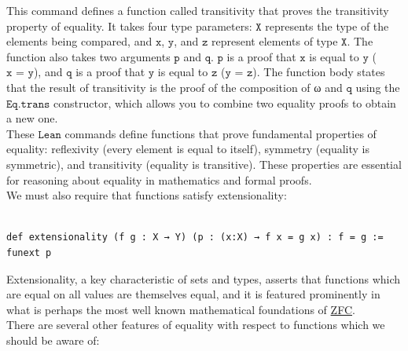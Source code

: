\documentclass{book}
\theoremstyle{definition}
\newcounter{lcounter}
\begin{document}
This command defines a function called transitivity that proves the transitivity property of equality. It takes four type parameters: $\texttt{X}$ represents the type of the elements being compared, and $\texttt{x}$, $\texttt{y}$, and $\texttt{z}$ represent elements of type $\texttt{X}$. The function also takes two arguments $\texttt{p}$ and $\texttt{q}$. $\texttt{p}$ is a proof that $\texttt{x}$ is equal to $\texttt{y}$ ($\texttt{x = y}$), and $\texttt{q}$ is a proof that $\texttt{y}$ is equal to $\texttt{z}$ ($\texttt{y = z}$). The function body states that the result of transitivity is the proof of the composition of ω and $\texttt{q}$ using the $\texttt{Eq.trans}$ constructor, which allows you to combine two equality proofs to obtain a new one.\\

These $\texttt{Lean}$ commands define functions that prove fundamental properties of equality: reflexivity (every element is equal to itself), symmetry (equality is symmetric), and transitivity (equality is transitive). These properties are essential for reasoning about equality in mathematics and formal proofs.\\

We must also require that functions satisfy extensionality:

\begin{center}
\begin{tcolorbox}[width=5in,colback={white},title={\begin{center}\texttt{Lean \thelcounter} \addtocounter{lcounter}{1}  \end{center}},colbacktitle=Blue,coltitle=black]
\begin{verbatim}

def extensionality (f g : X → Y) (p : (x:X) → f x = g x) : f = g := funext p

\end{verbatim}
\end{tcolorbox}
\end{center}

Extensionality, a key characteristic of sets and types, asserts that functions which are equal on all values are themselves equal, and it is featured prominently in what is perhaps the most well known mathematical foundations of \href{https://encyclopediaofmath.org/wiki/ZFC}{ZFC}.\\

There are several other features of equality with respect to functions which we should be aware of:
\end{document}
